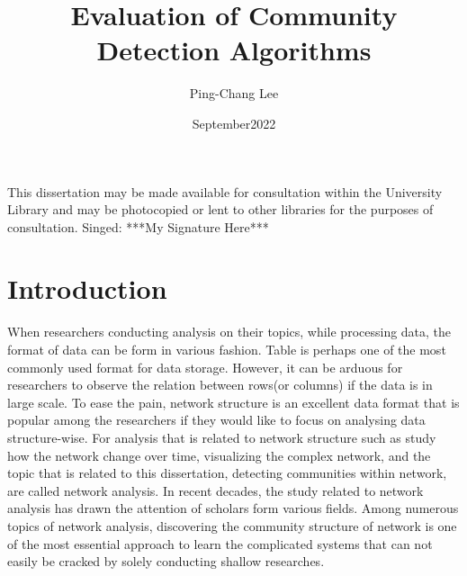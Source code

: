 \documentclass[12pt]{article}
\title{Evaluation of Community Detection Algorithms}
\author{Ping-Chang Lee}
\affil{MSc in Data Science \& Statistics \\ The University of Bath}
\date{{September}{2022}}
\begin{document}
\maketitle
\pagebreak

    
\bigbreak\bigbreak\bigbreak
\bigbreak\bigbreak\bigbreak
\bigbreak\bigbreak\bigbreak

This dissertation may be made available for consultation within the University Library and may be photocopied or lent to other libraries for the purposes of consultation.
\bigbreak\bigbreak\bigbreak
Singed: ***My Signature Here***
\pagebreak


\tableofcontents
\pagebreak

\section{Introduction}
When researchers conducting analysis on their topics, while processing data, the format of data can be form in various fashion. Table is perhaps one of the most commonly used format for data storage. However, it can be arduous for researchers to observe the relation between rows(or columns) if the data is in large scale. To ease the pain, network structure is an excellent data format that is popular among the researchers if they would like to focus on analysing data structure-wise. For analysis that is related to network structure such as study how the network change over time, visualizing the complex network, and the topic that is related to this dissertation, detecting communities within network, are called network analysis. In recent decades, the study related to network analysis has drawn the attention of scholars form various fields. Among numerous topics of network analysis, discovering the community structure of network is one of the most essential approach to learn the complicated systems that can not easily be cracked by solely conducting shallow researches\cite{1}. 

\bigbreak
\end{document}
